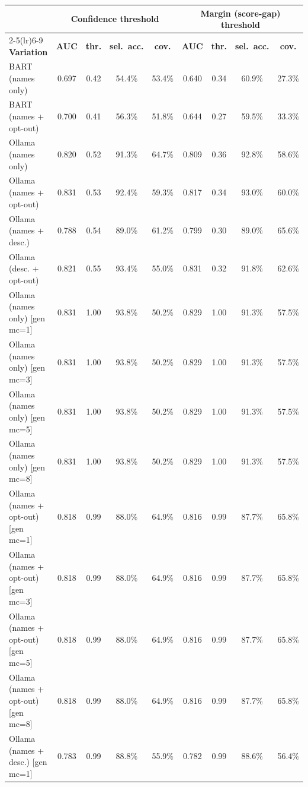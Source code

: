 
\begin{tabular}{lcccccccc}
\toprule
& \multicolumn{4}{c}{\textbf{Confidence threshold}} & \multicolumn{4}{c}{\textbf{Margin (score-gap) threshold}} \\
\cmidrule(lr){2-5}\cmidrule(lr){6-9}
\textbf{Variation} & \textbf{AUC} & \textbf{thr.} & \textbf{sel.\ acc.} & \textbf{cov.} & \textbf{AUC} & \textbf{thr.} & \textbf{sel.\ acc.} & \textbf{cov.} \\
\midrule
BART (names only) & 0.697 & 0.42 & 54.4\% & 53.4\% & 0.640 & 0.34 & 60.9\% & 27.3\% \\
BART (names + opt-out) & 0.700 & 0.41 & 56.3\% & 51.8\% & 0.644 & 0.27 & 59.5\% & 33.3\% \\
\addlinespace
Ollama (names only) & 0.820 & 0.52 & 91.3\% & 64.7\% & 0.809 & 0.36 & 92.8\% & 58.6\% \\
Ollama (names + opt-out) & 0.831 & 0.53 & 92.4\% & 59.3\% & 0.817 & 0.34 & 93.0\% & 60.0\% \\
Ollama (names + desc.) & 0.788 & 0.54 & 89.0\% & 61.2\% & 0.799 & 0.30 & 89.0\% & 65.6\% \\
Ollama (desc. + opt-out) & 0.821 & 0.55 & 93.4\% & 55.0\% & 0.831 & 0.32 & 91.8\% & 62.6\% \\
Ollama (names only) [gen mc=1] & 0.831 & 1.00 & 93.8\% & 50.2\% & 0.829 & 1.00 & 91.3\% & 57.5\% \\
Ollama (names only) [gen mc=3] & 0.831 & 1.00 & 93.8\% & 50.2\% & 0.829 & 1.00 & 91.3\% & 57.5\% \\
Ollama (names only) [gen mc=5] & 0.831 & 1.00 & 93.8\% & 50.2\% & 0.829 & 1.00 & 91.3\% & 57.5\% \\
Ollama (names only) [gen mc=8] & 0.831 & 1.00 & 93.8\% & 50.2\% & 0.829 & 1.00 & 91.3\% & 57.5\% \\
Ollama (names + opt-out) [gen mc=1] & 0.818 & 0.99 & 88.0\% & 64.9\% & 0.816 & 0.99 & 87.7\% & 65.8\% \\
Ollama (names + opt-out) [gen mc=3] & 0.818 & 0.99 & 88.0\% & 64.9\% & 0.816 & 0.99 & 87.7\% & 65.8\% \\
Ollama (names + opt-out) [gen mc=5] & 0.818 & 0.99 & 88.0\% & 64.9\% & 0.816 & 0.99 & 87.7\% & 65.8\% \\
Ollama (names + opt-out) [gen mc=8] & 0.818 & 0.99 & 88.0\% & 64.9\% & 0.816 & 0.99 & 87.7\% & 65.8\% \\
Ollama (names + desc.) [gen mc=1] & 0.783 & 0.99 & 88.8\% & 55.9\% & 0.782 & 0.99 & 88.6\% & 56.4\% \\

\end{tabular}
